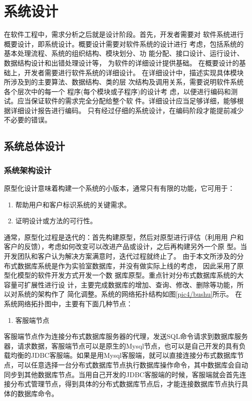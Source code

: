 
\chapter{系统设计}
在软件工程中，需求分析之后就是设计阶段。首先，开发者需要对
软件系统进行概要设计，即系统设计。概要设计需要对软件系统的设计进行
考虑，包括系统的基本处理流程、系统的组织结构、模块划分、功
能分配、接口设计、运行设计、数据结构设计和出错处理设计等，
为软件的详细设计提供基础。
在概要设计的基础上，开发者需要进行软件系统的详细设计。
在详细设计中，描述实现具体模块所涉及到的主要算法、数据结构、类的层
次结构及调用关系，需要说明软件系统各个层次中的每一个
程序(每个模块或子程序)的设计考
虑，以便进行编码和测试。应当保证软件的需求完全分配给整个软
件。详细设计应当足够详细，能够根据详细设计报告进行编码。
只有经过仔细的系统设计，在编码阶段才能提前减少不必要的错误。
\section{系统总体设计}
\subsection{系统架构设计}
原型化设计意味着构建一个系统的小版本，通常只有有限的功能，它可用于：
\begin{enumerate}
	\item 帮助用户和客户标识系统的关键需求。
	\item 证明设计或方法的可行性。
\end{enumerate}
通常，原型化过程是迭代的：首先构建原型，然后对原型进行评估（利用用
户和客户的反馈），考虑如何改变可以改进产品或设计，之后再构建另外一个原
型。当开发团队和客户认为解决方案满意时，迭代过程就终止了。
由于本文所涉及的分布式数据库系统是作为实验室数据库，并没有做实际上线的考虑，
因此采用了原型化模型的软件开发方式开发一个数
据库原型。重点针对分布式数据库系统的大容量可扩展性进行设
计，主要完成数据库的增加、查询、修改、删除等功能，所以对系统的架构作了
简化调整。系统的网络拓扑结构如图\ref{pic4/bushu}所示。
在系统网络拓扑图中，主要有下面几种节点：


	\begin{enumerate}
		\item 客服端节点
	\end{enumerate}

	客服端节点作为连接分布式数据库服务器的代理，发送SQL命令请求到数据库服务器，请求数据，客服端节点可以是原生的Mysql节点，也可以是自己开发的具有负载均衡的JDBC客服端。如果是用Mysql客服端，就可以直接连接分布式数据库节点，可以任意选择一台分布式数据库节点执行数据库操作命令，其中数据库会自动同步到其他数据库节点。当用自己开发的JDBC客服端的时候，客服端就会首先连接分布式管理节点，得到具体的分布式数据库节点后，才能连接数据库节点执行具体的数据库命令。

